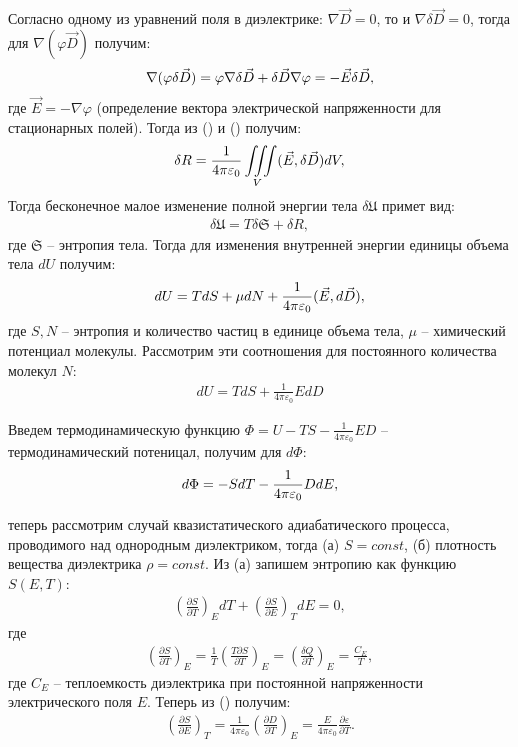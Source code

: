 \documentclass[__main__.tex]{subfiles}
\begin{document}
Согласно одному из уравнений поля в диэлектрике: $\nabla{\vec{D}}=0$, то и $\nabla{\delta\vec{D}}=0$, тогда для $\nabla(\varphi\vec{D})$ получим:
\begin{gather}
\nabla(\varphi\delta\vec{D}) =
\varphi\nabla\delta\vec{D} + \delta\vec{D}\nabla\varphi = -\vec{E}\delta\vec{D},\llabel{eq:mansy}
\end{gather}
где $\vec{E}=-\nabla\varphi$ (определение вектора электрической напряженности для стационарных полей). Тогда из () и () получим:
\begin{gather}
\delta R = \frac{1}{4\pi\varepsilon_0}\iiint\limits_{V}(\vec{E},\delta\vec{D})dV,
\llabel{eq:final-work}
\end{gather}
Тогда бесконечное малое изменение полной энергии тела $\delta\mathfrak{U}$ примет вид:
\begin{gather}
\delta\mathfrak{U} = T\delta\mathfrak{S} + \delta R,
\end{gather}
где $\mathfrak{S}$ -- энтропия тела. Тогда для изменения внутренней энергии единицы объема тела $dU$ получим:
\begin{gather}
dU = TdS + \mu dN + \frac{1}{4\pi\varepsilon_0}(\vec{E},d\vec{D}),
\llabel{eq:du-final}
\end{gather}
где $S, N$ -- энтропия и количество частиц в единице объема тела, $\mu$ -- химический потенциал молекулы. Рассмотрим эти соотношения для постоянного количества молекул $N$:
\begin{gather}
dU = TdS + \frac{1}{4\pi\varepsilon_0}EdD
\end{gather}

Введем термодинамическую функцию $\Phi = U - TS - \frac{1}{4\pi\varepsilon_0}ED$ -- термодинамический потеницал, получим для $d\Phi$:
\begin{gather}
d\Phi = -SdT - \frac{1}{4\pi\varepsilon_0}DdE,
\llabel{eq:memes}
\end{gather}

теперь рассмотрим случай квазистатического адиабатического процесса, проводимого над однородным диэлектриком, тогда (а) $S=const$, (б) плотность вещества диэлектрика $\rho=const$. Из (а) запишем энтропию как функцию $S(E,T)$:
\begin{gather}
\left(\frac{\partial S}{\partial T}\right)_E dT + \left(\frac{\partial S}{\partial E}\right)_T dE = 0,
\end{gather}
где
\begin{gather}
\left(\frac{\partial S}{\partial T}\right)_E =
\frac{1}{T}\left(\frac{T\partial S}{\partial T}\right)_E =
\left(\frac{\delta Q}{\partial T}\right)_E =
\frac{C_E}{T},
\end{gather}
где $C_E$ -- теплоемкость диэлектрика при постоянной напряженности электрического поля $E$. Теперь из () получим:
\begin{gather}
\left(\frac{\partial S}{\partial E}\right)_T =
\frac{1}{4\pi\varepsilon_0}\left(\frac{\partial D}{\partial T}\right)_E =
\frac{E}{4\pi\varepsilon_0}\frac{\partial \varepsilon}{\partial T}.
\end{gather}
\end{document}
